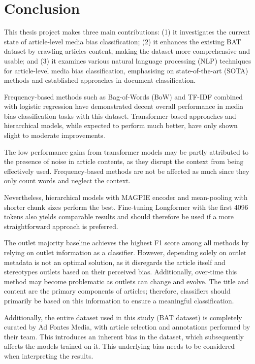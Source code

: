 \chapter{Conclusion}
\label{cha:6}

This thesis project makes three main contributions: (1) it investigates the current state of article-level media bias classification; (2) it enhances the existing BAT dataset by crawling articles content, making the dataset more comprehensive and usable; and (3) it examines various natural language processing (NLP) techniques for article-level media bias classification, emphasising on state-of-the-art (SOTA) methods and established approaches in document classification.

Frequency-based methods such as Bag-of-Words (BoW) and TF-IDF combined with logistic regression have demonstrated decent overall performance in media bias classification tasks with this dataset. Transformer-based approaches and hierarchical models, while expected to perform much better, have only shown slight to moderate improvements. 

The low performance gains from transformer models may be partly attributed to the presence of noise in article contents, as they disrupt the context from being effectively used. Frequency-based methods are not be affected as much since they only count words and neglect the context.

Nevertheless, hierarchical models with MAGPIE encoder and mean-pooling with shorter chunk sizes perform the best. Fine-tuning Longformer with the first 4096 tokens also yields comparable results and should therefore be used if a more straightforward approach is preferred.

The outlet majority baseline achieves the highest F1 score among all methods by relying on outlet information as a classifier. However, depending solely on outlet metadata is not an optimal solution, as it disregards the article itself and stereotypes outlets based on their perceived bias. Additionally, over-time this method may become problematic as outlets can change and evolve. The title and content are the primary components of articles; therefore, classifiers should primarily be based on this information to ensure a meaningful classification.

Additionally, the entire dataset used in this study (BAT dataset) is completely curated by Ad Fontes Media, with article selection and annotations performed by their team. This introduces an inherent bias in the dataset, which subsequently affects the models trained on it. This underlying bias needs to be considered when interpreting the results.

